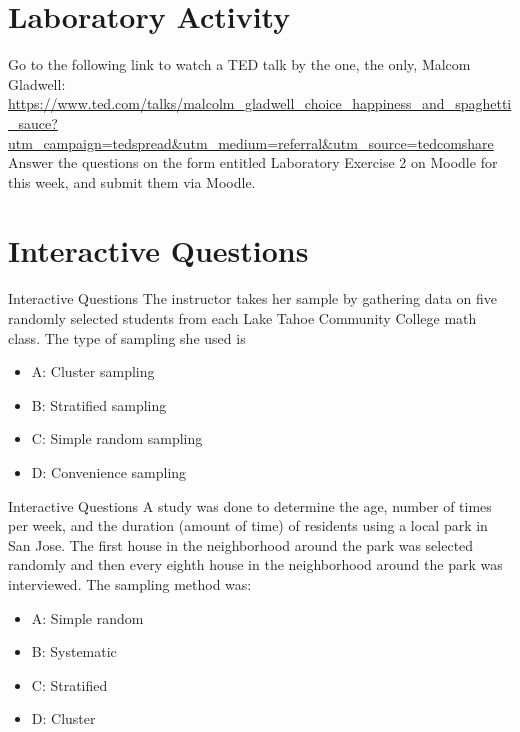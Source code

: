 \documentclass{beamer}
\begin{document}
\section{Laboratory Activity}

\begin{frame}
Go to the following link to watch a TED talk by the one, the only, Malcom Gladwell: \\ \vspace{1cm}
\url{https://www.ted.com/talks/malcolm_gladwell_choice_happiness_and_spaghetti_sauce?utm_campaign=tedspread&utm_medium=referral&utm_source=tedcomshare} \\ \vspace{1cm}
Answer the questions on the form entitled \alert{Laboratory Exercise 2} on Moodle for this week, and submit them via Moodle.
\end{frame}

\section{Interactive Questions}

\begin{frame}{Interactive Questions}
The instructor takes her sample by gathering data on five randomly selected students from each Lake Tahoe Community College math class. The type of sampling she used is
\begin{itemize}
\item A: Cluster sampling
\item B: Stratified sampling
\item C: Simple random sampling
\item D: Convenience sampling
\end{itemize}
\end{frame}

\begin{frame}{Interactive Questions}
A study was done to determine the age, number of times per week, and the duration (amount of time) of residents using
a local park in San Jose. The first house in the neighborhood around the park was selected randomly and then every eighth
house in the neighborhood around the park was interviewed. The sampling method was:
\begin{itemize}
\item A: Simple random
\item B: Systematic
\item C: Stratified
\item D: Cluster
\end{itemize}
\end{frame}
\end{document}
